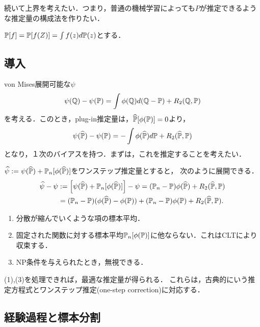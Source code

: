 \documentclass[uplatex,dvipdfmx]{jsreport}
\begin{document}
\begin{tcolorbox}[colframe=ForestGreen, colback=ForestGreen!10!white,breakable,colbacktitle=ForestGreen!40!white,coltitle=black,fonttitle=\bfseries\sffamily,
title=]
    続いて上界を考えたい．つまり，普通の機械学習によっても$P$が推定できるような推定量の構成法を作りたい．
\end{tcolorbox}

\begin{notation}
    $\mathbb{P}[f]=\mathbb{P}[f(Z)]=\int f(z)d\mathbb{P}(z)$とする．
\end{notation}

\subsection{導入}

\begin{problem}
    von Mises展開可能な$\psi$
    \[\psi(\mathbb{Q})-\psi(\mathbb{P})=\int\phi(\mathbb{Q})d(\mathbb{Q}-\mathbb{P})+R_2(\mathbb{Q},\mathbb{P})\]
    を考える．このとき，plug-in推定量は，$\widehat{\mathbb{P}}[\phi(\mathbb{P})]=0$より，
    \[\psi(\widehat{\mathbb{P}})-\psi(\mathbb{P})=-\int\phi(\widehat{\mathbb{P}})d\mathbb{P}+R_2(\widehat{\mathbb{P}},\mathbb{P})\]
    となり，１次のバイアスを持つ．まずは，これを推定することを考えたい．
\end{problem}
\begin{discussion}
    $\widehat{\psi}:=\psi(\widehat{\mathbb{P}})+\mathbb{P}_n[\phi(\widehat{\mathbb{P}})]$をワンステップ推定量とすると，
    次のように展開できる．
    \begin{align*}
        \widehat{\psi}-\psi&:=\left[\psi(\widehat{\mathbb{P}})+\mathbb{P}_n[\phi(\widehat{\mathbb{P}})]\right]-\psi
        =(\mathbb{P}_n-\mathbb{P})\phi(\widehat{\mathbb{P}})+R_2(\widehat{\mathbb{P}},\mathbb{P})\\
        &=(\mathbb{P}_n-\mathbb{P})(\phi(\widehat{\mathbb{P}})-\phi(\mathbb{P}))+(\mathbb{P}_n-\mathbb{P})\phi(\mathbb{P})+R_2(\widehat{\mathbb{P}},\mathbb{P}).
    \end{align*}
    \begin{enumerate}
        \item 分散が縮んでいくような項の標本平均．
        \item 固定された関数に対する標本平均$\mathbb{P}_n[\phi(\mathbb{P})]$に他ならない．これはCLTにより収束する．
        \item NP条件を与えられたとき，無視できる．
    \end{enumerate}
    (1),(3)を処理できれば，最適な推定量が得られる．
    これらは，古典的にいう推定方程式とワンステップ推定(one-step correction)に対応する．
\end{discussion}

\subsection{経験過程と標本分割}
\end{document}
